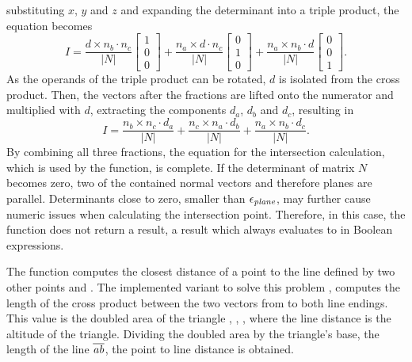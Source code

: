 substituting $x$, $y$ and $z$ and expanding the determinant into a triple product, the equation becomes
\begin{equation}
	I =
	\frac{d \times n_b \cdot n_c}{|N|} \begin{bmatrix} 1 \\ 0 \\ 0 \end{bmatrix} +
	\frac{n_a \times d \cdot n_c}{|N|} \begin{bmatrix} 0 \\ 1 \\ 0 \end{bmatrix} +
	\frac{n_a \times n_b \cdot d}{|N|} \begin{bmatrix} 0 \\ 0 \\ 1 \end{bmatrix} \text{.}
\end{equation}
As the operands of the triple product can be rotated, $d$ is isolated from the cross product.
Then, the vectors after the fractions are lifted onto the numerator and multiplied with $d$, extracting the components $d_a$, $d_b$ and $d_c$, resulting in
\begin{equation}
I =
	\frac{n_b \times n_c \cdot d_a}{|N|} +
	\frac{n_c \times n_a \cdot d_b}{|N|} +
	\frac{n_a \times n_b \cdot d_c}{|N|} \text{.}
\end{equation}
By combining all three fractions, the equation for the intersection calculation, which is used by the  function, is complete.
If the determinant of matrix $N$ becomes zero, two of the contained normal vectors and therefore planes are parallel.
Determinants close to zero, \ie smaller than $\epsilon_{\mathit{plane}}$, may further cause numeric issues when calculating the intersection point.
Therefore, in this case, the function does not return a result, \ie a result which always evaluates to \False in Boolean expressions.

The function  computes the closest distance of a point  to the line defined by two other points  and .
The implemented variant to solve this problem \cite{point_line_distance}, computes the length of the cross product between the two vectors from  to both line endings.
This value is the doubled area of the triangle , , , where the line distance is the altitude of the triangle.
Dividing the doubled area by the triangle's base, \ie the length of the line $\overline{\mathit{a}\mathit{b}}$, the point to line distance is obtained.


